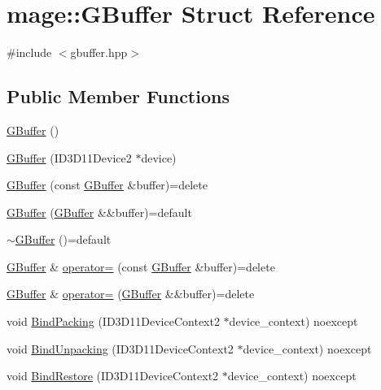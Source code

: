 \hypertarget{structmage_1_1_g_buffer}{}\section{mage\+:\+:G\+Buffer Struct Reference}
\label{structmage_1_1_g_buffer}


{\ttfamily \#include $<$gbuffer.\+hpp$>$}

\subsection*{Public Member Functions}
\begin{DoxyCompactItemize}
\item 
\hyperlink{structmage_1_1_g_buffer_a9111bf3ce5bf0a0648b3958b516386ae}{G\+Buffer} ()
\item 
\hyperlink{structmage_1_1_g_buffer_a7cb5a37658f5bc124a8c71d6a227d858}{G\+Buffer} (I\+D3\+D11\+Device2 $\ast$device)
\item 
\hyperlink{structmage_1_1_g_buffer_a3d437fcd8cb2b2ceb2f7c8f06a6d2690}{G\+Buffer} (const \hyperlink{structmage_1_1_g_buffer}{G\+Buffer} \&buffer)=delete
\item 
\hyperlink{structmage_1_1_g_buffer_aa020a8c3b269d88d814c3664d03d03c6}{G\+Buffer} (\hyperlink{structmage_1_1_g_buffer}{G\+Buffer} \&\&buffer)=default
\item 
\hyperlink{structmage_1_1_g_buffer_ace75566b38462d7edd1299379e418318}{$\sim$\+G\+Buffer} ()=default
\item 
\hyperlink{structmage_1_1_g_buffer}{G\+Buffer} \& \hyperlink{structmage_1_1_g_buffer_ac4b12cce6a06866958f3a674d7a7dcae}{operator=} (const \hyperlink{structmage_1_1_g_buffer}{G\+Buffer} \&buffer)=delete
\item 
\hyperlink{structmage_1_1_g_buffer}{G\+Buffer} \& \hyperlink{structmage_1_1_g_buffer_ab1d4ae70de89c0549f54ee76b0b078c3}{operator=} (\hyperlink{structmage_1_1_g_buffer}{G\+Buffer} \&\&buffer)=delete
\item 
void \hyperlink{structmage_1_1_g_buffer_a90645118643a60f597741ebb319eb077}{Bind\+Packing} (I\+D3\+D11\+Device\+Context2 $\ast$device\+\_\+context) noexcept
\item 
void \hyperlink{structmage_1_1_g_buffer_ae8495251fe7fc2402f8f8bae30c57b94}{Bind\+Unpacking} (I\+D3\+D11\+Device\+Context2 $\ast$device\+\_\+context) noexcept
\item 
void \hyperlink{structmage_1_1_g_buffer_a9d5be00779acac0212fe731cfd4e4fe4}{Bind\+Restore} (I\+D3\+D11\+Device\+Context2 $\ast$device\+\_\+context) noexcept
\end{DoxyCompactItemize}
